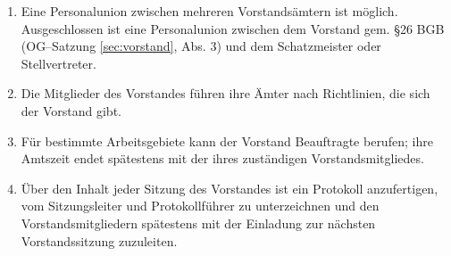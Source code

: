 \documentclass[%
12pt, %
a4paper, %
headsepline, %
footsepline, %
parskip, %
headings=normal, %
]{scrartcl}
\begin{document}
\begin{enumerate}
    \item Eine Personalunion zwischen mehreren Vorstandsämtern ist möglich. Ausgeschlossen ist eine Personalunion zwischen dem Vorstand gem. \S 26 BGB (OG--Satzung \ref{sec:vorstand}, Abs. 3) und dem Schatzmeister oder Stellvertreter.
    \item Die Mitglieder des Vorstandes führen ihre Ämter nach Richtlinien, die sich der Vorstand gibt.
    \item Für bestimmte Arbeitsgebiete kann der Vorstand Beauftragte berufen; ihre Amtszeit endet spätestens mit der ihres zuständigen Vorstandsmitgliedes.
    \item Über den Inhalt jeder Sitzung des Vorstandes ist ein Protokoll anzufertigen, vom Sitzungsleiter und Protokollführer zu unterzeichnen und den Vorstandsmitgliedern spätestens mit der Einladung zur nächsten Vorstandssitzung zuzuleiten.

\end{enumerate}
\end{document}
